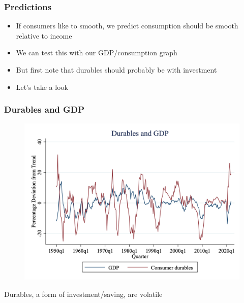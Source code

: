 \documentclass{beamer}
\begin{document}
\begin{frame}
\frametitle[alignment=center]{Predictions}
\begin{itemize}
\item If consumers like to smooth, we predict consumption should be smooth relative to income
\bigskip
\item We can test this with our GDP/consumption graph
\bigskip
\item But first note that durables should probably be with investment
\bigskip
\item Let's take a look
\end{itemize}
\end{frame}

\begin{frame}
\frametitle[alignment=center]{Durables and GDP}
\begin{figure}
\centering
\includegraphics[scale=0.2]{Figures/Fig_9pt6.png}
\end{figure}
Durables, a form of investment/saving, are volatile
\end{frame}
\end{document}
